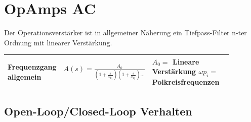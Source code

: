 \section{OpAmps AC}

Der Operationsverstärker ist in allgemeiner Näherung ein Tiefpass-Filter n-ter Ordnung mit linearer Verstärkung.

 \begin{tabular}{|p{0.15\linewidth}|p{0.28\linewidth}|p{0.445\linewidth}|}
 	\hline
 	Frequenzgang allgemein
 		& \large{$A(s) = \frac{A_{0}}{(1+\frac{s}{\omega_{p_1}})(1+\frac{s}{\omega_{p_2}})\dots}$}
 		& $A_{0}=$ Lineare Verstärkung \newline $\omega{p_i}=$ Polkreisfrequenzen \\
 	\hline
 \end{tabular}
 
\subsection{Open-Loop/Closed-Loop Verhalten}

